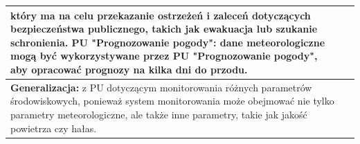 \documentclass{article}
\begin{document}
\begin{center}
\begin{center}
\begin{tabular}{|l|l|l|}
{        który ma na celu przekazanie ostrzeżeń i zaleceń dotyczących bezpieczeństwa publicznego, takich jak ewakuacja lub szukanie schronienia.
        \newline
        \textbf{PU "Prognozowanie pogody":} dane meteorologiczne mogą być wykorzystywane przez PU "Prognozowanie pogody", aby opracować prognozy na kilka dni do przodu.} \\
        \hline
        \hline
        \multicolumn{3}{|p{\dimexpr\linewidth-2\tabcolsep-2\arrayrulewidth}|}{\textbf{Generalizacja:}
        z PU dotyczącym monitorowania różnych parametrów środowiskowych, ponieważ system monitorowania
        może obejmować nie tylko parametry meteorologiczne, ale także inne parametry, takie jak jakość powietrza czy hałas.} \\
        \hline
        \end{tabular}
    \end{center}

    \newpage


\end{center}
\end{document}
